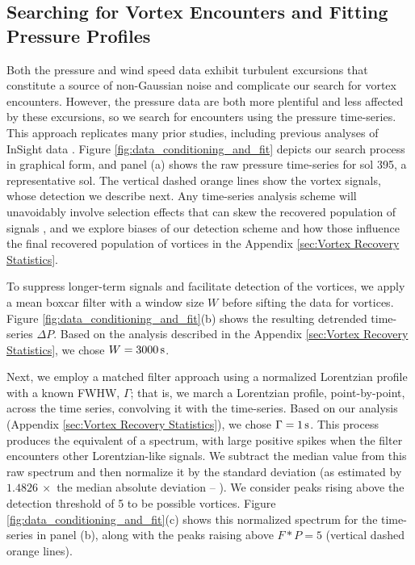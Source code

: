 \documentclass[linenumbers,trackchanges]{aastex63}
\begin{document}
\subsection{Searching for Vortex Encounters and Fitting Pressure Profiles}
\label{sec:Searching for Vortex Encounters and Fitting Pressure Profiles}
Both the pressure and wind speed data exhibit turbulent excursions that constitute a source of non-Gaussian noise and complicate our search for vortex encounters. However, the pressure data are both more plentiful and less affected by these excursions, so we search for encounters using the pressure time-series. This approach replicates many prior studies, including previous analyses of InSight data \citep{2021JGRE..12606511S, 2021Icar..35514119L}. Figure \ref{fig:data_conditioning_and_fit} depicts our search process in graphical form, and panel (a) shows the raw pressure time-series for sol 395, a representative sol. The vertical dashed orange lines show the vortex signals, whose detection we describe next. Any time-series analysis scheme will unavoidably involve selection effects that can skew the recovered population of signals \citep{2018Icar..299..166J}, and we explore biases of our detection scheme and how those influence the final recovered population of vortices in the Appendix \ref{sec:Vortex Recovery Statistics}. 

To suppress longer-term signals and facilitate detection of the vortices, we apply a mean boxcar filter with a window size $W$ before sifting the data for vortices. Figure \ref{fig:data_conditioning_and_fit}(b) shows the resulting detrended time-series $\Delta P$. Based on the analysis described in the Appendix \ref{sec:Vortex Recovery Statistics}, we chose $W = 3000\,{\rm s}$. 

Next, we employ a matched filter approach \citep[][ch.~13]{Press2007} using a normalized Lorentzian profile with a known FWHW, $\Gamma$; that is, we march a Lorentzian profile, point-by-point, across the time series, convolving it with the time-series. Based on our analysis (Appendix \ref{sec:Vortex Recovery Statistics}), we chose $\Gamma = 1\,{\rm s}$. This process produces the equivalent of a spectrum, with large positive spikes when the filter encounters other Lorentzian-like signals. We subtract the median value from this raw spectrum and then normalize it by the standard deviation (as estimated by $1.4826\ \times$ the median absolute deviation -- \citealp{doi:10.1080/01621459.1993.10476408}). We consider peaks rising above the detection threshold of 5 to be possible vortices. Figure \ref{fig:data_conditioning_and_fit}(c) shows this normalized spectrum for the time-series in panel (b), along with the peaks raising above $F \ast P = 5$ (vertical dashed orange lines). 
\end{document}
